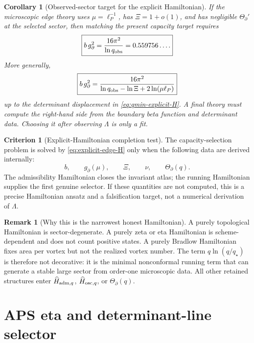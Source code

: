 \documentclass[aps,prd,reprint,nofootinbib,superscriptaddress,floatfix]{revtex4-2}
\numberwithin{equation}{section}
\theoremstyle{definition}
\newtheorem{criterion}{Criterion}[section]
\newtheorem{remark}{Remark}[section]
\theoremstyle{plain}
\newtheorem{corollary}{Corollary}[section]
\begin{document}
\begin{corollary}[Observed-sector target for the explicit Hamiltonian]
If the microscopic edge theory uses \(\mu=\ell_P^{-1}\), has
\(\Xi=1+o(1)\), and has negligible \(\Theta_\partial'\) at the selected
sector, then matching the present capacity target requires
\begin{equation}
\boxed{
b\,g_\partial^2
=
\frac{16\pi^2}{\ln q_{\rm obs}}
=
0.559756\ldots .
}
\end{equation}
More generally,
\begin{equation}
\boxed{
b\,g_\partial^2
=
\frac{16\pi^2}
{\ln q_{\rm obs}-\ln\Xi+2\ln(\mu\ell_P)}
}
\end{equation}
up to the determinant displacement in \cref{eq:qmin-explicit-H}.  A final
theory must compute the right-hand side from the boundary beta function and
determinant data.  Choosing it after observing \(\Lambda\) is only a fit.
\end{corollary}

\begin{criterion}[Explicit-Hamiltonian completion test]
The capacity-selection problem is solved by \cref{eq:explicit-edge-H} only
when the following data are derived internally:
\[
\boxed{
b,\qquad g_\partial(\mu),\qquad \Xi,\qquad
\nu,\qquad \Theta_\partial(q).
}
\]
The admissibility Hamiltonian closes the invariant atlas; the running
Hamiltonian supplies the first genuine selector.  If these quantities are
not computed, this is a precise Hamiltonian ansatz and a falsification target,
not a numerical derivation of \(\Lambda\).
\end{criterion}

\begin{remark}[Why this is the narrowest honest Hamiltonian]
A purely topological Hamiltonian is sector-degenerate.  A purely zeta or eta
Hamiltonian is scheme-dependent and does not count positive states.  A purely
Bradlow Hamiltonian fixes area per vortex but not the realized vortex number.
The term \(q\ln(q/q_\star)\) is therefore not decorative: it is the minimal
nonconformal running term that can generate a stable large sector from
order-one microscopic data.  All other retained structures enter
\(\widehat H_{{\rm adm},q}\), \(\widehat H_{{\rm osc},q}\), or
\(\Theta_\partial(q)\).
\end{remark}


\section{APS eta and determinant-line selector}
\label{sec:aps-eta-selector}
\end{document}
